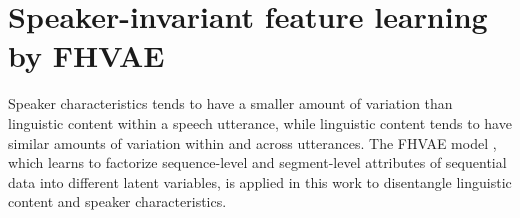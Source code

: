 \documentclass[a4paper]{article}
\begin{document}
\section{Speaker-invariant feature learning by FHVAE}
Speaker characteristics tends to have a smaller amount of variation than linguistic content within a speech  utterance, while linguistic content tends to have similar amounts of variation within and across utterances. The FHVAE model \cite{hsu2017nips}, which learns to factorize sequence-level and segment-level   attributes of sequential data into different latent variables, 
is applied in this work to disentangle linguistic content and speaker characteristics.

\end{document}
